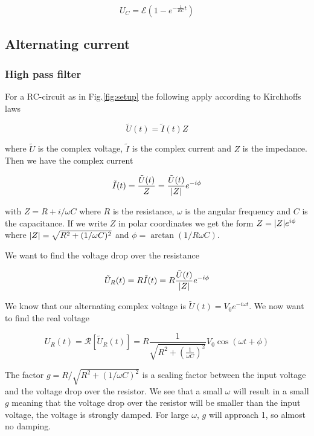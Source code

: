 \documentclass[../main/main.tex]{subfiles}
\begin{document}
\begin{equation}
  \label{lolleren2}
  U_C = \mathcal{E} \left( 1 - e^{- \frac{1}{RC} t} \right)
\end{equation}

\subsection*{Alternating current}
\subsubsection{High pass filter}

For a RC-circuit as in Fig.\ref{fig:setup} the following apply according to Kirchhoffs laws

\begin{equation}
	\tilde{U}(t) = \tilde{I}(t)Z
\end{equation}

where \( \tilde{U} \) is the complex voltage, \( \tilde{I} \) is the complex current and \( Z \) is the impedance. Then we have the complex current

\begin{equation}
	\tilde{I}(t) = \frac{\tilde{U}(t)}{Z} = \frac{\tilde{U}(t)}{ \abs{Z}} e^{-i \phi}
\end{equation}

with \( Z = R + i/ \omega C \) where \( R \) is the resistance, \(\omega \) is the angular frequency and \( C \) is the capacitance.
If we write \( Z \) in polar coordinates we get the form \( Z = \abs{Z} e^{i \phi} \) where \( \abs{Z} = \sqrt{R^2 + (1/\omega C)^2} \) and \( \phi = \arctan(1 / R \omega C ) \).

We want to find the voltage drop over the resistance

\begin{equation}
	\tilde{U}_R(t) = R \tilde{I}(t) = R \frac{\tilde{U}(t)}{ \abs{Z}} e^{-i \phi}
\end{equation}

We know that our alternating complex voltage is \( \tilde{U}(t) = V_0 e^{-i \omega t } \).
We now want to find the real voltage

\begin{equation}
	U_R(t) = \mathcal{R}[\tilde{U}_R(t)] = R \frac{1}{ \sqrt{R^2 + \left( \frac{1}{ \omega C } \right)^2 } } V_0 \cos ( \omega t + \phi)
\end{equation}

The factor \( g = R / \sqrt{R^2 + ( 1 / \omega C )^2} \) is a scaling factor between the input voltage and the voltage drop over the resistor.
We see that a small \( \omega \) will result in a small \( g \) meaning that the voltage drop over the resistor will be smaller than the input voltage, the voltage is strongly damped.
For large \( \omega \), \( g \) will approach 1, so almost no damping.
\end{document}

